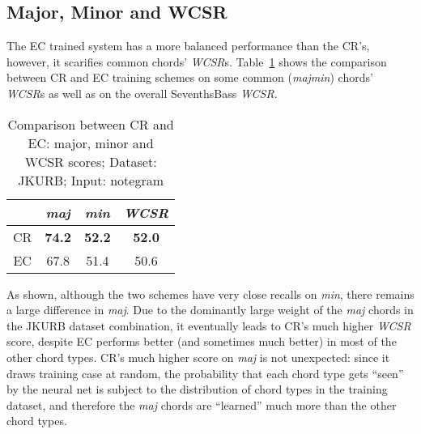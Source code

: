 \subsection{Major, Minor and WCSR}

The EC trained system has a more balanced performance than the CR's, however, it scarifies common chords' \textit{WCSR}s. Table~\ref{tab:sb} shows the comparison between CR and EC training schemes on some common (\textit{majmin}) \cite{burgoyne2011expert} chords' \textit{WCSR}s as well as on the overall SeventhsBass \textit{WCSR}.
\begin{table}[htb]
	\caption{Comparison between CR and EC: major, minor and WCSR scores; Dataset: JKURB; Input: notegram}
	\centering
	\scriptsize
	\begin{tabular}{|c|c|c|c|} \hline
		& \textit{maj} & \textit{min} & \textit{WCSR} \\ \hline
		CR & \textbf{74.2} & \textbf{52.2} & \textbf{52.0} \\ \hline
		EC &  67.8 & 51.4 & 50.6 \\ \hline
	\end{tabular}
	\label{tab:sb}
\end{table}

As shown, although the two schemes have very close recalls on \textit{min}, there remains a large difference in \textit{maj}. Due to the dominantly large weight of the \textit{maj} chords in the JKURB dataset combination, it eventually leads to CR's much higher \textit{WCSR} score, despite EC performs better (and sometimes much better) in most of the other chord types. CR's much higher score on \textit{maj} is not unexpected: since it draws training case at random, the probability that each chord type gets ``seen'' by the neural net is subject to the distribution of chord types in the training dataset, and therefore the \textit{maj} chords are ``learned'' much more than the other chord types.

